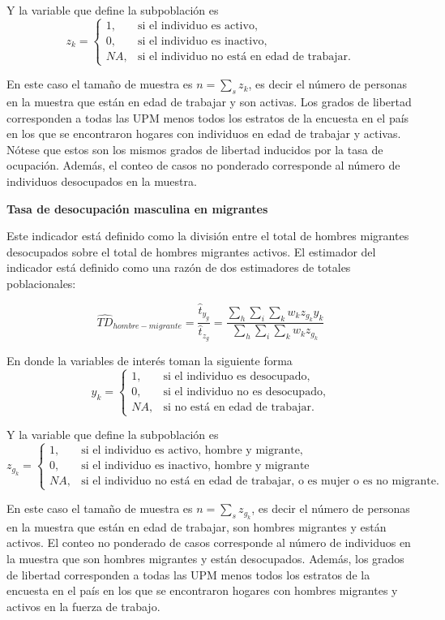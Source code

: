 \documentclass[
  12pt,
  spanish,
]{book}
\begin{document}
Y la variable que define la subpoblación es
\[
z_{k}=
\begin{cases}
1, &\text{si el individuo es activo,}\\
0, &\text{si el individuo es inactivo,}\\
NA, &\text{si el individuo no está en edad de trabajar.}
\end{cases}
\]

En este caso el tamaño de muestra es \(n = \sum_s z_{k}\), es decir el número de personas en la muestra que están en edad de trabajar y son activas. Los grados de libertad corresponden a todas las UPM menos todos los estratos de la encuesta en el país en los que se encontraron hogares con individuos en edad de trabajar y activas. Nótese que estos son los mismos grados de libertad inducidos por la tasa de ocupación. Además, el conteo de casos no ponderado corresponde al número de individuos desocupados en la muestra.

\textbf{Tasa de desocupación masculina en migrantes}

Este indicador está definido como la división entre el total de hombres migrantes desocupados sobre el total de hombres migrantes activos. El estimador del indicador está definido como una razón de dos estimadores de totales poblacionales:

\[
\widehat{TD}_{hombre-migrante} =  \frac{\hat t_{y_g}}{\hat t_{z_g}} =\frac{\sum_h\sum_i\sum_k w_kz_{g_k}y_{k}}{\sum_h\sum_i\sum_k w_kz_{g_k}}
\]

En donde la variables de interés toman la siguiente forma
\[
y_{k}=
\begin{cases}
1, &\text{si el individuo es desocupado,}\\
0, &\text{si el individuo no es desocupado,}\\
NA, &\text{si no está en edad de trabajar.}
\end{cases}
\]

Y la variable que define la subpoblación es
\[
z_{g_k}=
\begin{cases}
1, &\text{si el individuo es activo, hombre y migrante,}\\
0, &\text{si el individuo es inactivo, hombre y migrante}\\
NA, &\text{si el individuo no está en edad de trabajar, o es mujer o es no migrante.}
\end{cases}
\]

En este caso el tamaño de muestra es \(n = \sum_s z_{g_k}\), es decir el número de personas en la muestra que están en edad de trabajar, son hombres migrantes y están activos. El conteo no ponderado de casos corresponde al número de individuos en la muestra que son hombres migrantes y están desocupados. Además, los grados de libertad corresponden a todas las UPM menos todos los estratos de la encuesta en el país en los que se encontraron hogares con hombres migrantes y activos en la fuerza de trabajo.
\end{document}
